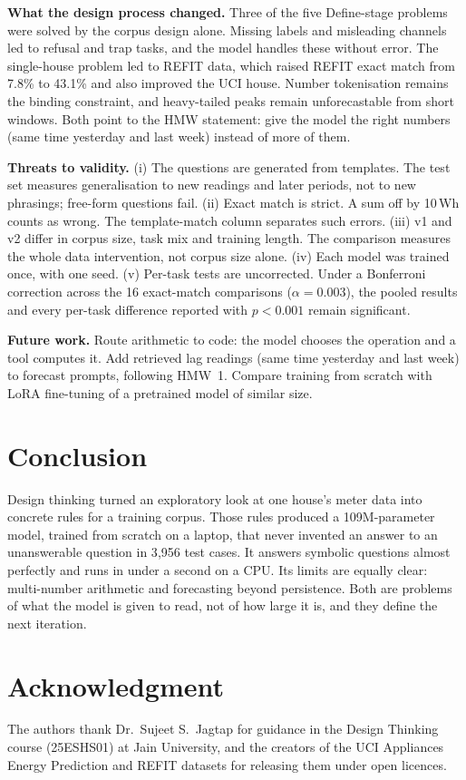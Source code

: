 \documentclass[conference]{IEEEtran}
\begin{document}
\textbf{What the design process changed.} Three of the five Define-stage problems were solved by the corpus design
alone. Missing labels and misleading channels led to refusal and trap tasks, and the model handles these without
error. The single-house problem led to REFIT data, which raised REFIT exact match from 7.8\% to 43.1\% and also
improved the UCI house. Number tokenisation remains the binding constraint, and heavy-tailed peaks remain
unforecastable from short windows. Both point to the HMW statement: give the model the right numbers (same time
yesterday and last week) instead of more of them.

\textbf{Threats to validity.}
(i) The questions are generated from templates. The test set measures generalisation to new readings and later
periods, not to new phrasings; free-form questions fail.
(ii) Exact match is strict. A sum off by 10\,Wh counts as wrong. The template-match column separates such errors.
(iii) v1 and v2 differ in corpus size, task mix and training length. The comparison measures the whole data
intervention, not corpus size alone.
(iv) Each model was trained once, with one seed.
(v) Per-task tests are uncorrected. Under a Bonferroni correction across the 16 exact-match comparisons
($\alpha=0.003$), the pooled results and every per-task difference reported with $p<0.001$ remain significant.

\textbf{Future work.} Route arithmetic to code: the model chooses the operation and a tool computes it. Add
retrieved lag readings (same time yesterday and last week) to forecast prompts, following HMW~1. Compare training
from scratch with LoRA fine-tuning \cite{hu2022lora} of a pretrained model of similar size.

\section{Conclusion}

Design thinking turned an exploratory look at one house's meter data into concrete rules for a training corpus.
Those rules produced a 109M-parameter model, trained from scratch on a laptop, that never invented an answer to an
unanswerable question in 3{,}956 test cases. It answers symbolic questions almost perfectly and runs in under a
second on a CPU. Its limits are equally clear: multi-number arithmetic and forecasting beyond persistence. Both are
problems of what the model is given to read, not of how large it is, and they define the next iteration.

\section*{Acknowledgment}

The authors thank Dr.\ Sujeet S.\ Jagtap for guidance in the Design Thinking course (25ESHS01) at Jain University,
and the creators of the UCI Appliances Energy Prediction and REFIT datasets for releasing them under open licences.



\end{document}
